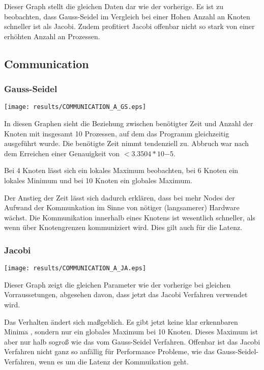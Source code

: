 \documentclass[a4paper,12pt]{scrartcl}
\begin{document}
Dieser Graph stellt die gleichen Daten dar wie der vorherige. Es ist zu
beobachten, dass Gauss-Seidel im Vergleich bei einer Hohen Anzahl an Knoten schneller ist als Jacobi.
Zudem profitiert Jacobi offenbar nicht so stark von einer erhöhten Anzahl an Prozessen.

\subsection{Communication}
\subsubsection{Gauss-Seidel}
\texttt{[image: results/COMMUNICATION\_A\_GS.eps]}


In diesen Graphen sieht die Beziehung zwischen benötigter Zeit
und Anzahl der Knoten mit insgesamt 10 Prozessen, auf dem das Programm
gleichzeitig ausgeführt wurde. Die benötigte Zeit nimmt tendenziell zu.
Abbruch war nach dem Erreichen einer Genauigkeit von $<3.3504*10{-5}$.

Bei 4 Knoten lässt sich ein lokales Maximum beobachten, bei 6 Knoten ein lokales Minimum und bei 10 Knoten ein globales Maximum.

Der Anstieg der Zeit lässt sich dadurch erklären, dass bei mehr Nodes der
Aufwand der Kommunkation im Sinne von nötiger (langsamerer) Hardware wächst. Die Kommunikation innerhalb eines Knotens ist wesentlich schneller, als wenn über Knotengrenzen kommuniziert wird.
Dies gilt auch für die Latenz.


\subsubsection{Jacobi}
\texttt{[image: results/COMMUNICATION\_A\_JA.eps]}


Dieser Graph zeigt die gleichen Parameter wie der vorherige bei gleichen Vorraussetungen, abgesehen davon, dass jetzt das Jacobi Verfahren verwendet wird. 

Das Verhalten ändert sich maßgeblich. Es gibt jetzt keine klar erkennbaren Minima , sondern nur ein globales Maximum bei 10 Knoten. Dieses Maximum ist aber nur halb sogroß wie das vom Gauss-Seidel Verfahren.
Offenbar ist das Jacobi Verfahren nicht ganz so anfällig für Performance Probleme, wie das Gauss-Seidel-Verfahren, wenn es um die Latenz der Kommuikation geht.
\end{document}
